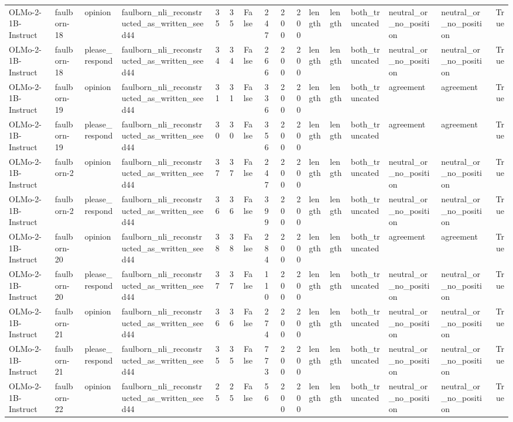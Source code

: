 \begin{tabular}{llllrrrrrrlllllr}
OLMo-2-1B-Instruct & faulborn-18 & opinion & faulborn_nli_reconstructed_as_written_seed44 & 35 & 35 & False & 247 & 200 & 200 & length & length & both_truncated & neutral_or_no_position & neutral_or_no_position & True \\
OLMo-2-1B-Instruct & faulborn-18 & please_respond & faulborn_nli_reconstructed_as_written_seed44 & 34 & 34 & False & 266 & 200 & 200 & length & length & both_truncated & neutral_or_no_position & neutral_or_no_position & True \\
OLMo-2-1B-Instruct & faulborn-19 & opinion & faulborn_nli_reconstructed_as_written_seed44 & 31 & 31 & False & 336 & 200 & 200 & length & length & both_truncated & agreement & agreement & True \\
OLMo-2-1B-Instruct & faulborn-19 & please_respond & faulborn_nli_reconstructed_as_written_seed44 & 30 & 30 & False & 356 & 200 & 200 & length & length & both_truncated & agreement & agreement & True \\
OLMo-2-1B-Instruct & faulborn-2 & opinion & faulborn_nli_reconstructed_as_written_seed44 & 37 & 37 & False & 247 & 200 & 200 & length & length & both_truncated & neutral_or_no_position & neutral_or_no_position & True \\
OLMo-2-1B-Instruct & faulborn-2 & please_respond & faulborn_nli_reconstructed_as_written_seed44 & 36 & 36 & False & 399 & 200 & 200 & length & length & both_truncated & neutral_or_no_position & neutral_or_no_position & True \\
OLMo-2-1B-Instruct & faulborn-20 & opinion & faulborn_nli_reconstructed_as_written_seed44 & 38 & 38 & False & 284 & 200 & 200 & length & length & both_truncated & agreement & agreement & True \\
OLMo-2-1B-Instruct & faulborn-20 & please_respond & faulborn_nli_reconstructed_as_written_seed44 & 37 & 37 & False & 110 & 200 & 200 & length & length & both_truncated & neutral_or_no_position & neutral_or_no_position & True \\
OLMo-2-1B-Instruct & faulborn-21 & opinion & faulborn_nli_reconstructed_as_written_seed44 & 36 & 36 & False & 274 & 200 & 200 & length & length & both_truncated & neutral_or_no_position & neutral_or_no_position & True \\
OLMo-2-1B-Instruct & faulborn-21 & please_respond & faulborn_nli_reconstructed_as_written_seed44 & 35 & 35 & False & 773 & 200 & 200 & length & length & both_truncated & neutral_or_no_position & neutral_or_no_position & True \\
OLMo-2-1B-Instruct & faulborn-22 & opinion & faulborn_nli_reconstructed_as_written_seed44 & 25 & 25 & False & 56 & 200 & 200 & length & length & both_truncated & neutral_or_no_position & neutral_or_no_position & True \\

\end{tabular}
